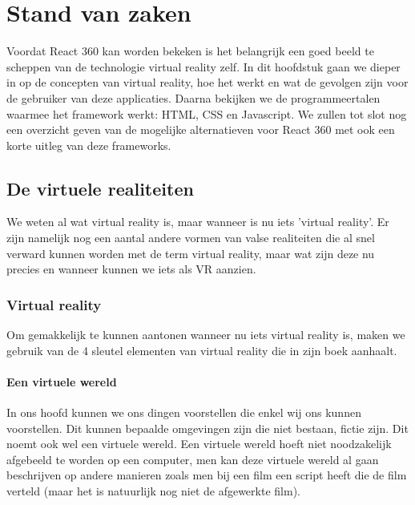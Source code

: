 \chapter{Stand van zaken}
\label{ch:stand-van-zaken}



Voordat React 360 kan worden bekeken is het belangrijk een goed beeld te scheppen van de technologie virtual reality zelf. In dit hoofdstuk gaan we dieper in op de concepten van virtual reality, hoe het werkt en wat de gevolgen zijn voor de gebruiker van deze applicaties. Daarna bekijken we de programmeertalen waarmee het framework werkt: HTML, CSS en Javascript. We zullen tot slot nog een overzicht geven van de mogelijke alternatieven voor React 360 met ook een korte uitleg van deze frameworks.

\section{De virtuele realiteiten}
\label{secvirtuele-realiteiten}
We weten al wat virtual reality is, maar wanneer is nu iets 'virtual reality'. Er zijn namelijk nog een aantal andere vormen van valse realiteiten die al snel verward kunnen worden met de term virtual reality, maar wat zijn deze nu precies en wanneer kunnen we iets als VR aanzien.

\subsection{Virtual reality}
\label{subsec:virtual-reality}
Om gemakkelijk te kunnen aantonen wanneer nu iets virtual reality is, maken we gebruik van de 4 sleutel elementen van virtual reality die \autocite{Sherman2000} in zijn boek aanhaalt.

\subsubsection{Een virtuele wereld}
\label{ssubsec:virtuele-wereld}
In ons hoofd kunnen we ons dingen voorstellen die enkel wij ons kunnen voorstellen. Dit kunnen bepaalde omgevingen zijn die niet bestaan, fictie zijn. Dit noemt ook wel een virtuele wereld. Een virtuele wereld hoeft niet noodzakelijk afgebeeld te worden op een computer, men kan deze virtuele wereld al gaan beschrijven op andere manieren zoals men bij een film een script heeft die de film verteld (maar het is natuurlijk nog niet de afgewerkte film).

